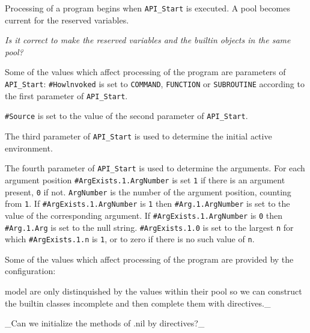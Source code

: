 Processing of a program begins when \texttt{API\_Start} is executed. A
pool becomes current for the reserved variables.



\emph{Is it correct to make the reserved variables and the builtin
objects in the same pool?}

Some of the values which affect processing of the program are parameters
of \texttt{API\_Start}: \texttt{\#Howlnvoked} is set to
\texttt{\textquotesingle{}COMMAND\textquotesingle{}},
\texttt{\textquotesingle{}FUNCTION\textquotesingle{}} or
\texttt{\textquotesingle{}SUBROUTINE\textquotesingle{}} according to the
first parameter of \texttt{API\_Start}.

\texttt{\#Source} is set to the value of the second parameter of
\texttt{API\_Start}.

The third parameter of \texttt{API\_Start} is used to determine the
initial active environment.

The fourth parameter of \texttt{API\_Start} is used to determine the
arguments. For each argument position \texttt{\#ArgExists.1.ArgNumber}
is set \texttt{\textquotesingle{}1\textquotesingle{}} if there is an
argument present, \texttt{\textquotesingle{}0\textquotesingle{}} if not.
\texttt{ArgNumber} is the number of the argument position, counting from
\texttt{1}. If \texttt{\#ArgExists.1.ArgNumber} is
\texttt{\textquotesingle{}1\textquotesingle{}} then
\texttt{\#Arg.1.ArgNumber} is set to the value of the corresponding
argument. If \texttt{\#ArgExists.1.ArgNumber} is
\texttt{\textquotesingle{}0\textquotesingle{}} then \texttt{\#Arg.1.Arg}
is set to the null string. \texttt{\#ArgExists.1.0} is set to the
largest \texttt{n} for which \texttt{\#ArgExists.1.n} is
\texttt{\textquotesingle{}1\textquotesingle{}}, or to zero if there is
no such value of \texttt{n}.

Some of the values which affect processing of the program are provided
by the configuration:


model are only distinquished by the values within their pool so we can
construct the builtin classes incomplete and then complete them with
directives.\_

\_Can we initialize the methods of .nil by directives?\_



